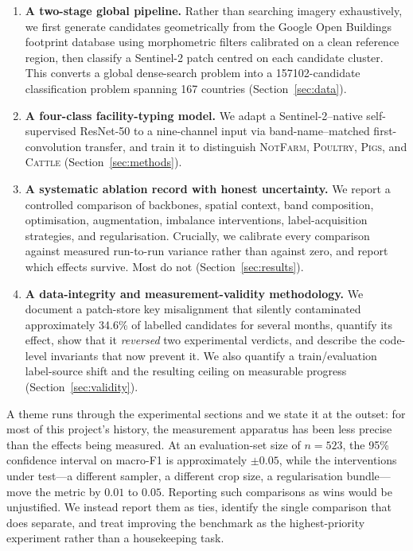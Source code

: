 \documentclass[11pt,a4paper]{article}
\begin{document}
\begin{enumerate}
  \item \textbf{A two-stage global pipeline.} Rather than searching imagery
  exhaustively, we first generate candidates geometrically from the Google Open
  Buildings footprint database \citep{sirko2021openbuildings} using
  morphometric filters calibrated on a clean reference region, then classify a
  Sentinel-2 patch centred on each candidate cluster. This converts a global
  dense-search problem into a \num{157102}-candidate classification problem
  spanning 167 countries (Section~\ref{sec:data}).

  \item \textbf{A four-class facility-typing model.} We adapt a
  Sentinel-2--native self-supervised ResNet-50 \citep{wang2024softcon,he2016resnet}
  to a nine-channel input via band-name--matched first-convolution transfer, and
  train it to distinguish \textsc{NotFarm}, \textsc{Poultry}, \textsc{Pigs}, and
  \textsc{Cattle} (Section~\ref{sec:methods}).

  \item \textbf{A systematic ablation record with honest uncertainty.} We report
  a controlled comparison of backbones, spatial context, band composition,
  optimisation, augmentation, imbalance interventions, label-acquisition
  strategies, and regularisation. Crucially, we calibrate every comparison
  against measured run-to-run variance rather than against zero, and report
  which effects survive. Most do not (Section~\ref{sec:results}).

  \item \textbf{A data-integrity and measurement-validity methodology.} We
  document a patch-store key misalignment that silently contaminated
  approximately 34.6\% of labelled candidates for several months, quantify its
  effect, show that it \emph{reversed} two experimental verdicts, and describe
  the code-level invariants that now prevent it. We also quantify a
  train/evaluation label-source shift and the resulting ceiling on measurable
  progress (Section~\ref{sec:validity}).
\end{enumerate}

A theme runs through the experimental sections and we state it at the outset:
for most of this project's history, the measurement apparatus has been less
precise than the effects being measured. At an evaluation-set size of
$n=523$, the 95\% confidence interval on macro-F1 is approximately $\pm0.05$,
while the interventions under test---a different sampler, a different crop
size, a regularisation bundle---move the metric by $0.01$ to $0.05$. Reporting
such comparisons as wins would be unjustified. We instead report them as ties,
identify the single comparison that does separate, and treat improving the
benchmark as the highest-priority experiment rather than a housekeeping task.
\end{document}
